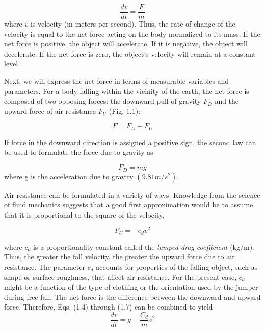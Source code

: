 \documentclass[../main.tex]{subfiles}
\begin{document}
\begin{equation}
\tag{1.4}
\dfrac{dv}{dt}=\dfrac{F}{m}
\end{equation}
where $v$ is velocity (in meters per second). Thus, the rate of change of the velocity is equal
to the net force acting on the body normalized to its mass. If the net force is positive, the
object will accelerate. If it is negative, the object will decelerate. If the net force is zero, the
object's velocity will remain at a constant level.


Next, we will express the net force in terms of measurable variables and parameters.
For a body falling within the vicinity of the earth, the net force is composed of two opposing forces: the downward pull of gravity $F_D$ and the upward force of air resistance $F_U$
(Fig. 1.1):

\begin{equation}
\tag{1.5}
F= F_D + F_U
\end{equation}

If force in the downward direction is assigned a positive sign, the second law can be
used to formulate the force due to gravity as

\begin{equation}
\tag{1.6}
F_D=mg
\end{equation}
where g is the acceleration due to gravity $(9.81 m/s^2
)$.

Air resistance can be formulated in a variety of ways. Knowledge from the science of
fluid mechanics suggests that a good first approximation would be to assume that it is proportional to the square of the velocity,

\begin{equation}
\tag{1.7}
F_U=-c_dv^2
\end{equation}

where $c_d$ is a proportionality constant called the \textsl{lumped drag coefficient} (kg/m). Thus, the
greater the fall velocity, the greater the upward force due to air resistance. The parameter
$c_d$ accounts for properties of the falling object, such as shape or surface roughness, that affect air resistance. For the present case, $c_d$ might be a function of the type of clothing or the
orientation used by the jumper during free fall.
The net force is the difference between the downward and upward force. Therefore,
Eqs. (1.4) through (1.7) can be combined to yield
\begin{equation}
\tag{1.8}
\dfrac{dv}{dt}=g-\dfrac{C_d}{m}v^2
\end{equation}
\end{document}
